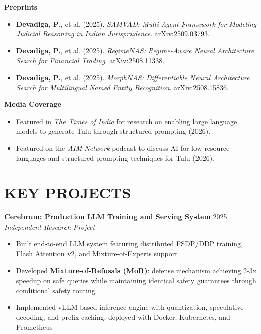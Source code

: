 \documentclass[a4paper,9pt]{extarticle}
\begin{document}
\noindent\textbf{Preprints}
\begin{itemize}

\item \textbf{Devadiga, P.}, et al. (2025). \textit{SAMVAD: Multi-Agent Framework for Modeling Judicial Reasoning in Indian Jurisprudence}. arXiv:2509.03793.

\item \textbf{Devadiga, P.}, et al. (2025). \textit{RegimeNAS: Regime-Aware Neural Architecture Search for Financial Trading}. arXiv:2508.11338.

\item \textbf{Devadiga, P.}, et al. (2025). \textit{MorphNAS: Differentiable Neural Architecture Search for Multilingual Named Entity Recognition}. arXiv:2508.15836.

\end{itemize}

\noindent\textbf{Media Coverage}
\begin{itemize}

\item Featured in \textit{The Times of India} for research on enabling large language models to generate Tulu through structured prompting (2026).

\item Featured on the \textit{AIM Network} podcast to discuss AI for low-resource languages and structured prompting techniques for Tulu (2026).

\end{itemize}

\section*{KEY PROJECTS}
\noindent
\textbf{Cerebrum: Production LLM Training and Serving System} \hfill 2025\\
\textit{Independent Research Project}
\begin{itemize}
    \item Built end-to-end LLM system featuring distributed FSDP/DDP training, Flash Attention v2, and Mixture-of-Experts support
    \item Developed \textbf{Mixture-of-Refusals (MoR)}: defense mechanism achieving 2-3x speedup on safe queries while maintaining identical safety guarantees through conditional safety routing
    \item Implemented vLLM-based inference engine with quantization, speculative decoding, and prefix caching; deployed with Docker, Kubernetes, and Prometheus
\end{itemize}
\end{document}
